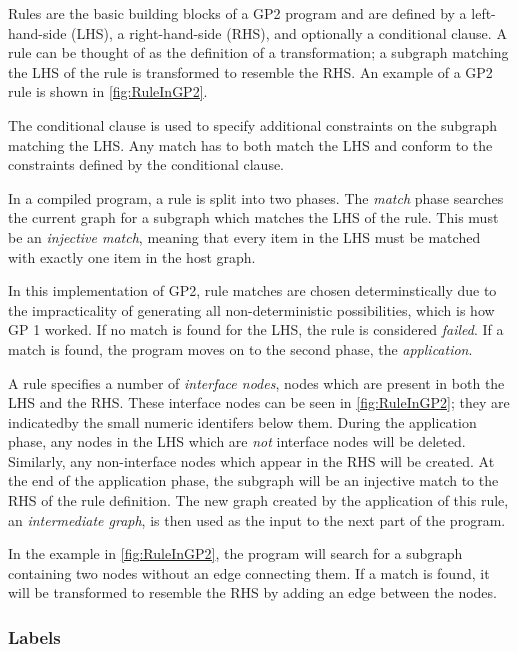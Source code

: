 \documentclass[authoryearcitations]{UoYCSproject}
\begin{document}
Rules are the basic building blocks of a GP2 program and are defined by a
left-hand-side (LHS), a right-hand-side (RHS), and optionally a conditional
clause. A rule can be thought of as the definition of a transformation; a subgraph
matching the LHS of the rule is transformed to resemble the RHS. An example of a
GP2 rule is shown in \autoref{fig:RuleInGP2}.

The conditional clause is used to specify additional constraints on the subgraph
matching the LHS. Any match has to both match the LHS and conform to the constraints
defined by the conditional clause.

In a compiled program, a rule is split into two phases. The \emph{match} phase
searches the current graph for a subgraph which matches the LHS of the rule. This must
be an \emph{injective match}, meaning that every item in the LHS must be matched with
exactly one item in the host graph.

In this implementation of GP2, rule matches are chosen determinstically due to the
impracticality of generating all non-deterministic possibilities, which is how GP 1 
worked. If no match is found for the LHS, the rule is considered \emph{failed}. If a
match is found, the program moves on to the second phase, the \emph{application}.

A rule specifies a number of \emph{interface nodes}, nodes which are present in both
the LHS and the RHS. These interface nodes can be seen in \autoref{fig:RuleInGP2}; they
are indicatedby the small numeric identifers below them. During the application phase,
any nodes in the LHS which are \emph{not} interface nodes will be deleted. Similarly,
any non-interface nodes which appear in the RHS will be created. At the end of the
application phase, the subgraph will be an injective match to the RHS of the rule
definition. The new graph created by the application of this rule, an \emph{intermediate
graph}, is then used as the input to the next part of the program.

In the example in \autoref{fig:RuleInGP2}, the program will search for a subgraph
containing two nodes without an edge connecting them. If a match is found, it will
be transformed to resemble the RHS by adding an edge between the nodes.


\subsubsection{Labels}
\label{sec:Labels}
\end{document}
